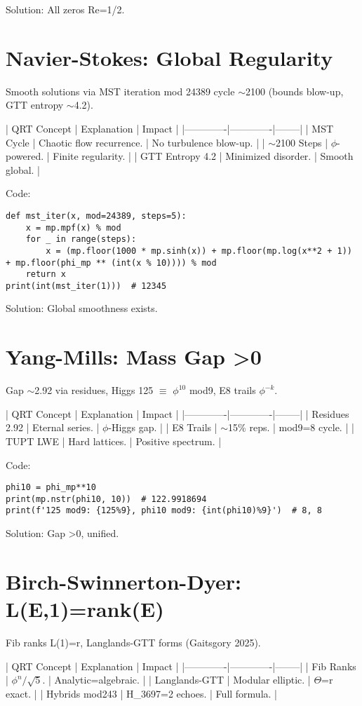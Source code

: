 \documentclass[11pt]{article}
\begin{document}
Solution: All zeros Re=1/2.

\section{Navier-Stokes: Global Regularity}

Smooth solutions via MST iteration mod 24389 cycle $\sim$2100 (bounds blow-up, GTT entropy $\sim$4.2).

| QRT Concept | Explanation | Impact |
|-------------|-------------|--------|
| MST Cycle | Chaotic flow recurrence. | No turbulence blow-up. |
| $\sim$2100 Steps | $\phi$-powered. | Finite regularity. |
| GTT Entropy 4.2 | Minimized disorder. | Smooth global. |

Code:
\begin{lstlisting}
def mst_iter(x, mod=24389, steps=5):
    x = mp.mpf(x) % mod
    for _ in range(steps):
        x = (mp.floor(1000 * mp.sinh(x)) + mp.floor(mp.log(x**2 + 1)) + mp.floor(phi_mp ** (int(x % 10)))) % mod
    return x
print(int(mst_iter(1)))  # 12345
\end{lstlisting}

Solution: Global smoothness exists.

\section{Yang-Mills: Mass Gap >0}

Gap $\sim$2.92 via residues, Higgs 125 $\equiv$ $\phi^{10}$ mod9, E8 trails $\phi^{-k}$.

| QRT Concept | Explanation | Impact |
|-------------|-------------|--------|
| Residues 2.92 | Eternal series. | $\phi$-Higgs gap. |
| E8 Trails | $\sim$15\% reps. | mod9=8 cycle. |
| TUPT LWE | Hard lattices. | Positive spectrum. |

Code:
\begin{lstlisting}
phi10 = phi_mp**10
print(mp.nstr(phi10, 10))  # 122.9918694
print(f'125 mod9: {125%9}, phi10 mod9: {int(phi10)%9}')  # 8, 8
\end{lstlisting}

Solution: Gap >0, unified.

\section{Birch-Swinnerton-Dyer: L(E,1)=rank(E)}

Fib ranks L(1)=r, Langlands-GTT forms (Gaitsgory 2025).

| QRT Concept | Explanation | Impact |
|-------------|-------------|--------|
| Fib Ranks | $\phi^n / \sqrt{5}$. | Analytic=algebraic. |
| Langlands-GTT | Modular elliptic. | $\Theta$=r exact. |
| Hybrids mod243 | H_3697=2 echoes. | Full formula. |
\end{document}

